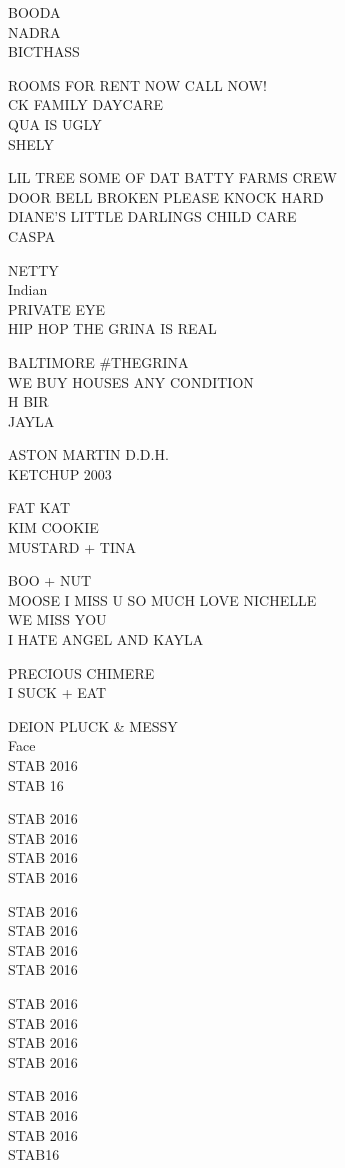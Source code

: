 \documentclass[10pt,letterpaper]{article}
\begin{document}
BOODA\\
NADRA\\
BICTHASS

ROOMS FOR RENT NOW CALL NOW!\\
CK FAMILY DAYCARE\\
QUA IS UGLY\\
SHELY

LIL TREE SOME OF DAT BATTY FARMS CREW\\
DOOR BELL BROKEN PLEASE KNOCK HARD\\
DIANE'S LITTLE DARLINGS CHILD CARE\\
CASPA

NETTY\\
Indian\\
PRIVATE EYE\\
HIP HOP THE GRINA IS REAL

BALTIMORE \#THEGRINA\\
WE BUY HOUSES ANY CONDITION\\
H BIR\\
JAYLA

ASTON MARTIN D.D.H.\\
KETCHUP 2003

FAT KAT\\
KIM COOKIE\\
MUSTARD + TINA

BOO + NUT\\
MOOSE I MISS U SO MUCH LOVE NICHELLE\\
WE MISS YOU\\
I HATE ANGEL AND KAYLA

PRECIOUS CHIMERE\\
I SUCK + EAT

DEION PLUCK \& MESSY\\
Face\\
STAB 2016\\
STAB 16

STAB 2016\\
STAB 2016\\
STAB 2016\\
STAB 2016

STAB 2016\\
STAB 2016\\
STAB 2016\\
STAB 2016

STAB 2016\\
STAB 2016\\
STAB 2016\\
STAB 2016

STAB 2016\\
STAB 2016\\
STAB 2016\\
STAB16
\end{document}
